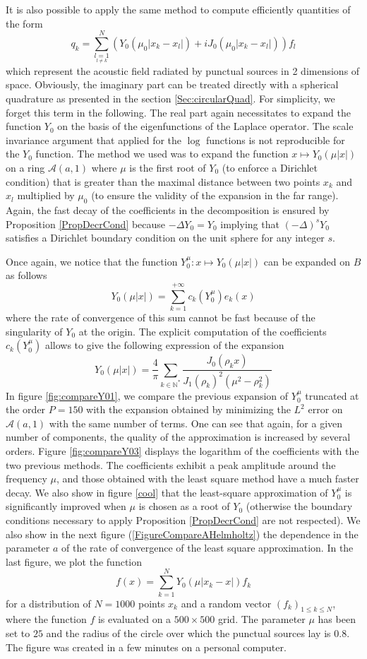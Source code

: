 \documentclass[11pt,a4paper]{article}
\begin{document}
It is also possible to apply the same method to compute efficiently quantities of the form 
\[ q_k = \sum_{\underset{l\neq k}{l=1}}^N \left(Y_0(\mu_0|x_k - x_l|) + iJ_0(\mu_0|x_k - x_l|)\right)f_l\]
which represent the acoustic field radiated by punctual sources in 2 dimensions of space. 
Obviously, the imaginary part can be treated directly with a spherical quadrature as presented in the section \ref{Sec:circularQuad}. For simplicity, we forget this term in the following. The real part again necessitates to expand the function $Y_0$ on the basis of the eigenfunctions of the Laplace operator. The scale invariance argument that applied for the $\log$ functions is not reproducible for the $Y_0$ function. The method we used was to expand the function $ x \mapsto Y_0(\mu |x|)$ on a ring $\mathcal{A}(a,1)$ where $\mu$ is the first root of $Y_0$ (to enforce a Dirichlet condition) that is greater than the maximal distance between two points $x_k$ and $x_l$ multiplied by $\mu_0$ (to ensure the validity of the expansion in the far range). Again, the fast decay of the coefficients in the decomposition is ensured by Proposition \ref{PropDecrCond} because $-\Delta Y_0 = Y_0$ implying that $(-\Delta)^s Y_0$ satisfies a Dirichlet boundary condition on the unit sphere for any integer $s$. 

Once again, we notice that the function $Y_0^\mu : x \mapsto Y_0(\mu|x|)$ can be expanded on $B$ as follows
\[ Y_0(\mu|x|) = \sum_{k=1}^{+\infty} c_k(Y_0^\mu)e_k(x) \] 
where the rate of convergence of this sum cannot be fast because of the singularity of $Y_0$ at the origin. The explicit computation of the coefficients $c_k(Y_0^\mu)$ allows to give the following expression of the expansion
\[Y_0(\mu|x|) = \frac{4}{\pi}\sum_{k\in \mathbb{N}^*}\dfrac{J_0(\rho_k x)}{J_1(\rho_k)^2(\mu^2 - \rho_k^2)}\]
In figure \ref{fig:compareY01}, we compare the previous expansion of $Y_0^\mu$ truncated at the order $P=150$ with the expansion obtained by minimizing the $L^2$ error on $\mathcal{A}(a,1)$ with the same number of terms. One can see that again, for a given number of components, the quality of the approximation is increased by several orders. Figure \ref{fig:compareY03} displays the logarithm of the coefficients with the two previous methods. The coefficients exhibit a peak amplitude around the frequency $\mu$, and those obtained with the least square method have a much faster decay. We also show in figure \ref{cool} that the least-square approximation of $Y_0^\mu$ is significantly improved when $\mu$ is chosen as a root of $Y_0$ (otherwise the boundary conditions necessary to apply Proposition \ref{PropDecrCond} are not respected). We also show in the next figure (\ref{FigureCompareAHelmholtz}) the dependence in the parameter $a$ of the rate of convergence of the least square approximation. 
In the last figure, we plot the function 
\[ f(x) = \sum_{k=1}^N{Y_0(\mu|x_k - x|)f_k}\]
for a distribution of $N = 1000$ points $x_k$ and a random vector $(f_k)_{1\leq k\leq N}$, where the function $f$ is evaluated on a $500\times 500$ grid. The parameter $\mu$ has been set to $25$ and the radius of the circle over which the punctual sources lay is $0.8$. The figure was created in a few minutes on a personal computer. 
\end{document}
